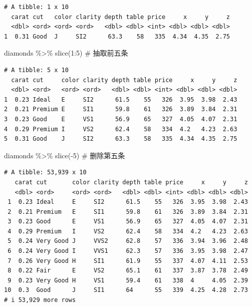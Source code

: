 \documentclass[
  letterpaper,
]{ctexbook}
\newenvironment{Shaded}{\begin{snugshade}}{\end{snugshade}}
\newcommand{\CommentTok}[1]{\textcolor[rgb]{0.37,0.37,0.37}{#1}}
\newcommand{\DecValTok}[1]{\textcolor[rgb]{0.68,0.00,0.00}{#1}}
\newcommand{\FunctionTok}[1]{\textcolor[rgb]{0.28,0.35,0.67}{#1}}
\newcommand{\NormalTok}[1]{\textcolor[rgb]{0.00,0.23,0.31}{#1}}
\newcommand{\SpecialCharTok}[1]{\textcolor[rgb]{0.37,0.37,0.37}{#1}}
\begin{document}
\begin{verbatim}
# A tibble: 1 x 10
  carat cut   color clarity depth table price     x     y     z
  <dbl> <ord> <ord> <ord>   <dbl> <dbl> <int> <dbl> <dbl> <dbl>
1  0.31 Good  J     SI2      63.3    58   335  4.34  4.35  2.75
\end{verbatim}

\begin{Shaded}
\begin{Highlighting}[]
\NormalTok{diamonds }\SpecialCharTok{\%\textgreater{}\%}
  \FunctionTok{slice}\NormalTok{(}\DecValTok{1}\SpecialCharTok{:}\DecValTok{5}\NormalTok{) }\CommentTok{\# 抽取前五条}
\end{Highlighting}
\end{Shaded}

\begin{verbatim}
# A tibble: 5 x 10
  carat cut     color clarity depth table price     x     y     z
  <dbl> <ord>   <ord> <ord>   <dbl> <dbl> <int> <dbl> <dbl> <dbl>
1  0.23 Ideal   E     SI2      61.5    55   326  3.95  3.98  2.43
2  0.21 Premium E     SI1      59.8    61   326  3.89  3.84  2.31
3  0.23 Good    E     VS1      56.9    65   327  4.05  4.07  2.31
4  0.29 Premium I     VS2      62.4    58   334  4.2   4.23  2.63
5  0.31 Good    J     SI2      63.3    58   335  4.34  4.35  2.75
\end{verbatim}

\begin{Shaded}
\begin{Highlighting}[]
\NormalTok{diamonds }\SpecialCharTok{\%\textgreater{}\%}
  \FunctionTok{slice}\NormalTok{(}\SpecialCharTok{{-}}\DecValTok{5}\NormalTok{) }\CommentTok{\# 删除第五条}
\end{Highlighting}
\end{Shaded}

\begin{verbatim}
# A tibble: 53,939 x 10
   carat cut       color clarity depth table price     x     y     z
   <dbl> <ord>     <ord> <ord>   <dbl> <dbl> <int> <dbl> <dbl> <dbl>
 1  0.23 Ideal     E     SI2      61.5    55   326  3.95  3.98  2.43
 2  0.21 Premium   E     SI1      59.8    61   326  3.89  3.84  2.31
 3  0.23 Good      E     VS1      56.9    65   327  4.05  4.07  2.31
 4  0.29 Premium   I     VS2      62.4    58   334  4.2   4.23  2.63
 5  0.24 Very Good J     VVS2     62.8    57   336  3.94  3.96  2.48
 6  0.24 Very Good I     VVS1     62.3    57   336  3.95  3.98  2.47
 7  0.26 Very Good H     SI1      61.9    55   337  4.07  4.11  2.53
 8  0.22 Fair      E     VS2      65.1    61   337  3.87  3.78  2.49
 9  0.23 Very Good H     VS1      59.4    61   338  4     4.05  2.39
10  0.3  Good      J     SI1      64      55   339  4.25  4.28  2.73
# i 53,929 more rows
\end{verbatim}
\end{document}
